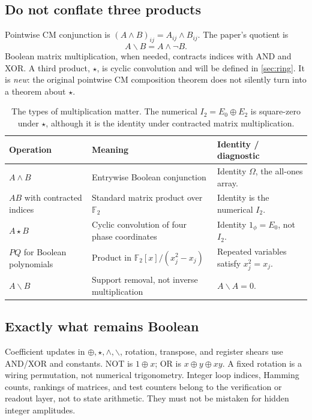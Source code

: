 \documentclass[11pt,a4paper]{article}
\theoremstyle{definition}\newtheorem{definition}[theorem]{Definition}
\theoremstyle{remark}\newtheorem{remark}[theorem]{Remark}
\newcommand{\F}{\mathbb F}
\newcommand{\one}{1_{\phi}}
\numberwithin{equation}{section}
\begin{document}
\subsection{Do not conflate three products}
Pointwise CM conjunction is $(A\land B)_{ij}=A_{ij}\land B_{ij}$. The paper's quotient is
\begin{equation}
 A\backslash B=A\land\neg B.
\end{equation}
Boolean matrix multiplication, when needed, contracts indices with AND and XOR. A third product, $\star$, is cyclic convolution and will be defined in \cref{sec:ring}. It is \emph{new}: the original pointwise CM composition theorem does not silently turn into a theorem about $\star$.

\begin{table}[htbp]\centering\small
\begin{tabularx}{\textwidth}{@{}L{0.23\textwidth}Y L{0.27\textwidth}@{}}\toprule
Operation & Meaning & Identity / diagnostic\\\midrule
$A\land B$ & Entrywise Boolean conjunction & Identity $\Omega$, the all-ones array.\\
$AB$ with contracted indices & Standard matrix product over $\F_2$ & Identity is the numerical $I_2$.\\
$A\star B$ & Cyclic convolution of four phase coordinates & Identity $\one=E_0$, not $I_2$.\\
$P Q$ for Boolean polynomials & Product in $\F_2[x]/(x_j^2-x_j)$ & Repeated variables satisfy $x_j^2=x_j$.\\
$A\backslash B$ & Support removal, not inverse multiplication & $A\backslash A=0$.\\\bottomrule
\end{tabularx}
\caption{The types of multiplication matter. The numerical $I_2=E_0\oplus E_2$ is square-zero under $\star$, although it is the identity under contracted matrix multiplication.}
\end{table}

\subsection{Exactly what remains Boolean}
Coefficient updates in $\oplus,\star,\land,\backslash$, rotation, transpose, and register shears use AND/XOR and constants. NOT is $1\oplus x$; OR is $x\oplus y\oplus xy$. A fixed rotation is a wiring permutation, not numerical trigonometry. Integer loop indices, Hamming counts, rankings of matrices, and test counters belong to the verification or readout layer, not to state arithmetic. They must not be mistaken for hidden integer amplitudes.
\end{document}
